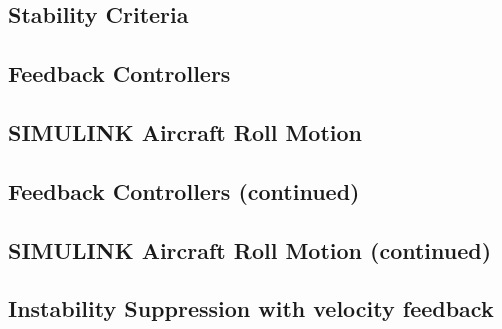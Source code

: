 \documentclass[12pt,letter]{article}
\begin{document}
\subsection{Stability Criteria}


\subsection{Feedback Controllers}


\subsection{SIMULINK Aircraft Roll Motion}


\subsection{Feedback Controllers (continued)}


\subsection{SIMULINK Aircraft Roll Motion (continued)}


\subsection{Instability Suppression with velocity feedback}




	\pagebreak
	\renewcommand{\thepage}{}
	\renewcommand\refname{References Cited}
	\pagestyle{plain}
	
	
\end{document}
